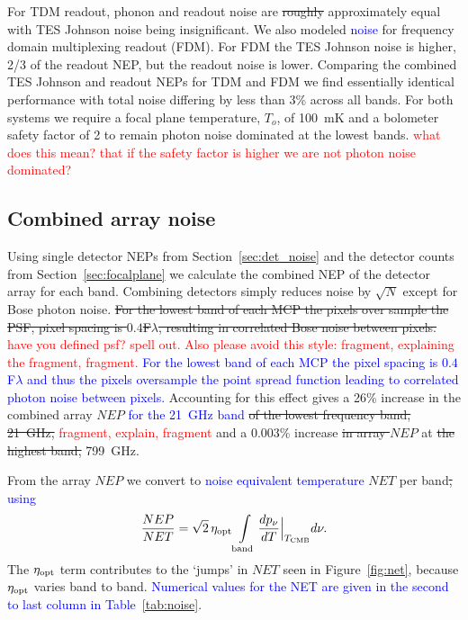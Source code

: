 \documentclass[]{spie}  %
\newcommand{\comr}[1]{\textcolor{red}{#1}}
\newcommand{\comb}[1]{\textcolor{blue}{#1}}
\newcommand{\como}[1]{\textcolor{orange}{#1}}
\begin{document}
For TDM readout, phonon and readout noise are \sout{roughly} approximately equal with TES Johnson noise being insignificant.  We also modeled 
\comb{noise} for frequency domain multiplexing readout (FDM).  For FDM the TES Johnson noise is higher, 2/3 of the readout NEP, but the readout 
noise is lower.  Comparing the combined TES Johnson and readout NEPs for TDM and FDM we find essentially identical performance 
with total noise differing by less than 3\% across all bands.  For both systems we require a focal plane temperature, $T_o$, of 
100~mK and a bolometer safety factor of 2 to remain photon noise dominated at the lowest bands. \comr{what does this mean? that 
if the safety factor is higher we are not photon noise dominated?} 

\subsection{Combined  array noise}

Using single detector NEPs from Section~\ref{sec:det_noise} and the detector counts from Section~\ref{sec:focalplane} we 
calculate the combined NEP of the detector array for each band.  Combining detectors simply reduces noise by $\sqrt{N}$ 
except for Bose photon noise. \sout{For the lowest band of each MCP the pixels over sample the PSF, 
pixel spacing is $0.4$F$\lambda$, resulting in correlated 
Bose noise between pixels.} \comr{have you defined psf? spell out. Also please avoid this style: fragment, explaining the fragment, fragment.}  
\comb{For the lowest band of each MCP the pixel spacing is $0.4$F$\lambda$  and thus the pixels oversample the point spread function leading 
to correlated photon noise between pixels.}
Accounting for this effect gives a 26\% increase in the combined array $NEP$ \comb{for the 21~GHz band} \sout{of the lowest frequency band, 21~GHz,} 
\comr{fragment, explain, fragment} and  
a 0.003\% increase \sout{in array $NEP$} at \sout{the highest band,} 799~GHz.  

From the array $NEP$ we convert to \comb{noise equivalent temperature} $NET$ per band\sout{,} \comb{using}
\begin{equation}
\label{eq:NET}
\frac{NEP}{NET} = \sqrt{2} \, \eta_{\rm opt} \int\limits_{\rm band}\frac{dp_{\nu}}{dT}\Bigr|_{T_{\rm CMB}} d\nu.
\end{equation} 
The $\eta_{\rm opt}$ term contributes to the `jumps' in $NET$ seen in Figure~\ref{fig:net}, because $\eta_{\rm opt}$ varies band to band.  
\comb{Numerical values for the NET are given in the second to last column in Table~\ref{tab:noise}}.
\end{document}

